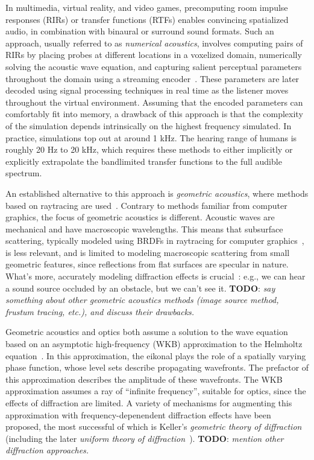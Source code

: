 \documentclass{siamart190516}
\begin{document}
In multimedia, virtual reality, and video games, precomputing room
impulse responses (RIRs) or transfer functions (RTFs) enables
convincing spatialized audio, in combination with binaural or surround
sound formats. Such an approach, usually referred to as
\emph{numerical acoustics}, involves computing pairs of RIRs by
placing probes at different locations in a voxelized domain,
numerically solving the acoustic wave equation, and capturing salient
perceptual parameters throughout the domain using a streaming
encoder~\cite{Raghuvanshi:2014aa,Raghuvanshi:2018aa}. These parameters
are later decoded using signal processing techniques in real time as
the listener moves throughout the virtual environment. Assuming that
the encoded parameters can comfortably fit into memory, a drawback of
this approach is that the complexity of the simulation depends
intrinsically on the highest frequency simulated. In practice,
simulations top out at around 1 kHz. The hearing range of humans is
roughly 20 Hz to 20 kHz, which requires these methods to either
implicitly or explicitly extrapolate the bandlimited transfer
functions to the full audible spectrum.

An established alternative to this approach is \emph{geometric
  acoustics}, where methods based on raytracing are
used~\cite{Savioja:2015aa}. Contrary to methods familiar from computer
graphics, the focus of geometric acoustics is different. Acoustic
waves are mechanical and have macroscopic wavelengths. This means that
subsurface scattering, typically modeled using BRDFs in raytracing for
computer graphics~\cite{Nicodemus:1965aa}, is less relevant, and is
limited to modeling macroscopic scattering from small geometric
features, since reflections from flat surfaces are specular in
nature. What's more, accurately modeling diffraction effects is
crucial~\cite{Schissler:2014aa}: e.g., we can hear a sound source
occluded by an obstacle, but we can't see it. \textbf{TODO}: \emph{say
  something about other geometric acoustics methods (image source
  method, frustum tracing, etc.), and discuss their drawbacks.}

Geometric acoustics and optics both assume a solution to the wave
equation based on an asymptotic high-frequency (WKB) approximation to
the Helmholtz equation~\cite{Popov:2002aa}. In this approximation, the
eikonal plays the role of a spatially varying phase function, whose
level sets describe propagating wavefronts. The prefactor of this
approximation describes the amplitude of these wavefronts. The WKB
approximation assumes a ray of ``infinite frequency'', suitable for
optics, since the effects of diffraction are limited. A variety of
mechanisms for augmenting this approximation with
frequency-depenendent diffraction effects have been proposed, the most
successful of which is Keller's \emph{geometric theory of
  diffraction}~\cite{Keller:1962aa} (including the later \emph{uniform
  theory of diffraction}~\cite{Kouyoumjian:1974aa}). \textbf{TODO}:
\emph{mention other diffraction approaches.}
\end{document}

